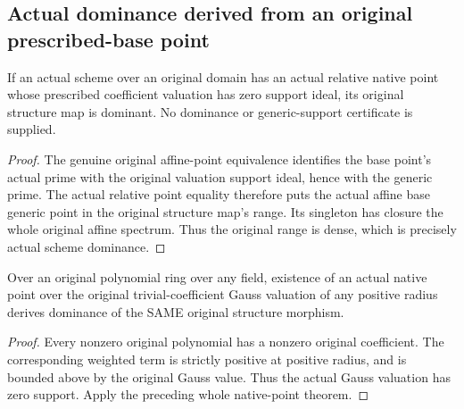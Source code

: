\subsection{Actual dominance derived from an original prescribed-base point}

\begin{lemma}
\label{berkovich:actual-prescribed-point-dominance}
\leanok
If an actual scheme over an original domain has an actual relative native point
whose prescribed coefficient valuation has zero support ideal, its original
structure map is dominant. No dominance or generic-support certificate is supplied.
\end{lemma}
\begin{proof}
The genuine original affine-point equivalence identifies the base point's
actual prime with the original valuation support ideal, hence with the generic
prime. The actual relative point equality therefore puts the actual affine
base generic point in the original structure map's range. Its singleton has
closure the whole original affine spectrum. Thus the original range is dense,
which is precisely actual scheme dominance.
\end{proof}

\begin{lemma}
\label{berkovich:actual-gauss-point-dominance}
\leanok
{}
Over an original polynomial ring over any field, existence of an actual native
point over the original trivial-coefficient Gauss valuation of any positive
radius derives dominance of the SAME original structure morphism.
\end{lemma}
\begin{proof}
Every nonzero original polynomial has a nonzero original coefficient.
The corresponding weighted term is strictly positive at positive radius,
and is bounded above by the original Gauss value. Thus the actual Gauss
valuation has zero support. Apply the preceding whole native-point theorem.
\end{proof}
